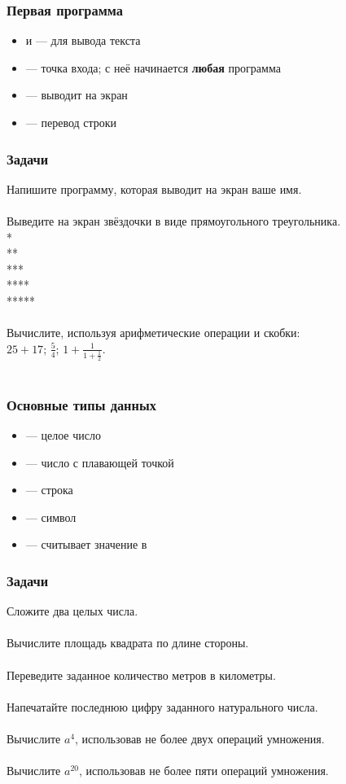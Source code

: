 \documentclass[PDF,10pt,usenames,dvipsnames,t,fragile]{beamer}
\newcommand{\bigqm}[1][1]{\text{\rm\larger[#1]{\textbf{?}}}}
\newcommand{\prblm}[1]{{\bigqm[1]} {#1 \\} \vspace{-6pt} \\} %
\begin{document}
\begin{frame}[fragile]
	\frametitle{Первая программа}
	\begin{itemize}
		\item	{} и  --- для вывода текста
		\item	{} --- точка входа; с неё начинается {\bf любая} программа
		\item	{} --- выводит  на экран
		\item	{} --- перевод строки
	\end{itemize}
\end{frame}

\begin{frame}
	\frametitle{Задачи}
	\prblm{Напишите программу, которая выводит на экран ваше имя.}
	\prblm{Выведите на экран звёздочки в виде прямоугольного треугольника. \\ *\\ ** \\ *** \\ **** \\ *****}
	\prblm{Вычислите, используя арифметические операции и скобки: \\ \vspace{5pt} $25+17$; \hspace{12pt} $\frac{5}{4}$; \hspace{12pt} $1+\frac{1}{1+\frac{1}{2}}$.}
\end{frame}

\begin{frame}
	\frametitle{Основные типы данных} 
	\begin{itemize}
		\item {} --- целое число
		\item {} --- число с плавающей точкой
		\item {} --- строка
		\item {} --- символ
		\item	{} --- считывает значение в 
	\end{itemize}
\end{frame}

\begin{frame}
	\frametitle{Задачи}
	\prblm{Сложите два целых числа.}
	\prblm{Вычислите площадь квадрата по длине стороны.}
	\prblm{Переведите заданное количество метров в километры.}
	\prblm{Напечатайте последнюю цифру заданного натурального числа.}
	\prblm{Вычислите $a^4$, использовав не более двух операций умножения.}
	\prblm{Вычислите $a^{20}$, использовав не более пяти операций умножения.}
\end{frame}
\end{document}
